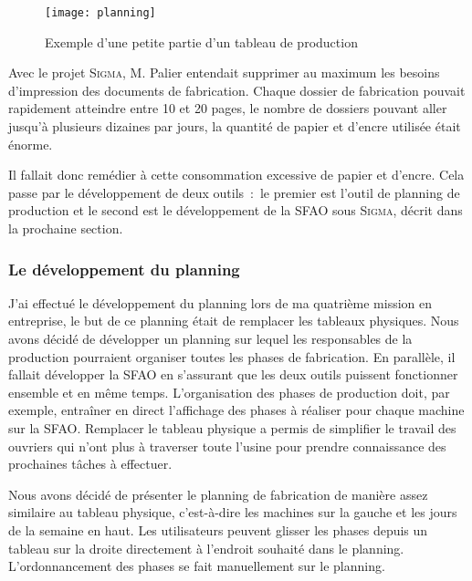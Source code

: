 \FloatBarrier
\begin{figure}[h!]
    \begin{minipage}[c]{0.6\textwidth}
        \begin{center}
            \texttt{[image: planning]}
        \end{center}
    \end{minipage}\hfill
    \begin{minipage}[c]{0.4\textwidth}
        \caption{Exemple d'une petite partie d'un tableau de production}
        \label{figure:planning}
    \end{minipage}
\end{figure}
\FloatBarrier

Avec le projet \textsc{Sigma}, M. Palier entendait supprimer au maximum les besoins d'impression des documents de fabrication.
Chaque dossier de fabrication pouvait rapidement atteindre entre 10 et 20 pages, le nombre de dossiers pouvant aller jusqu'à plusieurs dizaines par jours, la quantité de papier et d'encre utilisée était énorme.

Il fallait donc remédier à cette consommation excessive de papier et d'encre.
Cela passe par le développement de deux outils~:~le premier est l'outil de planning de production et le second est le développement de la SFAO sous \textsc{Sigma}, décrit dans la prochaine section.

\subsubsection{Le développement du planning}

J'ai effectué le développement du planning lors de ma quatrième mission en entreprise, le but de ce planning était de remplacer les tableaux physiques.
Nous avons décidé de développer un planning sur lequel les responsables de la production pourraient organiser toutes les phases de fabrication.
En parallèle, il fallait développer la SFAO en s'assurant que les deux outils puissent fonctionner ensemble et en même temps.
L'organisation des phases de production doit, par exemple, entraîner en direct l'affichage des phases à réaliser pour chaque machine sur la SFAO.
Remplacer le tableau physique a permis de simplifier le travail des ouvriers qui n'ont plus à traverser toute l'usine pour prendre connaissance des prochaines tâches à effectuer.

Nous avons décidé de présenter le planning de fabrication de manière assez similaire au tableau physique, c'est-à-dire les machines sur la gauche et les jours de la semaine en haut.
Les utilisateurs peuvent glisser les phases depuis un tableau sur la droite directement à l'endroit souhaité dans le planning.
L'ordonnancement des phases se fait manuellement sur le planning.


